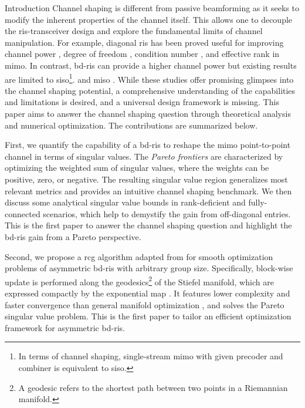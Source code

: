 \documentclass[journal]{IEEEtran}
\begin{document}
\begin{section}{Introduction}
	Channel shaping is different from passive beamforming as it seeks to modify the inherent properties of the channel itself.
	This allows one to decouple the \gls{ris}-transceiver design and explore the fundamental limits of channel manipulation.
	For example, diagonal \gls{ris} has been proved useful for improving channel power \cite{Ning2020}, degree of freedom \cite{Ozdogan2020,Li2023h}, condition number \cite{Zheng2022,Huang2023}, and effective rank \cite{ElMossallamy2021,Meng2023} in \gls{mimo}.
	In contrast, \gls{bd}-\gls{ris} can provide a higher channel power but existing results are limited to \gls{siso}\footnote{In terms of channel shaping, single-stream \gls{mimo} with given precoder and combiner \cite{Nerini2023} is equivalent to \gls{siso}.}. \cite{Nerini2023} and \gls{miso} \cite{Santamaria2023}.
	While these studies offer promising glimpses into the channel shaping potential, a comprehensive understanding of the capabilities and limitations is desired, and a universal design framework is missing.
	This paper aims to answer the channel shaping question through theoretical analysis and numerical optimization.
	The contributions are summarized below.

	First, we quantify the capability of a \gls{bd}-\gls{ris} to reshape the \gls{mimo} point-to-point channel in terms of singular values.
	The \emph{Pareto frontiers} are characterized by optimizing the {weighted sum of singular values}, where the weights can be positive, zero, or negative.
	The resulting singular value region generalizes most relevant metrics and provides an intuitive channel shaping benchmark.
	We then discuss some analytical singular value bounds in rank-deficient and fully-connected scenarios, which help to demystify the gain from off-diagonal entries.
	This is the first paper to answer the channel shaping question and highlight the \gls{bd}-\gls{ris} gain from a Pareto perspective.

	Second, we propose a \gls{rcg} algorithm adapted from \cite{Abrudan2008,Abrudan2009} for smooth optimization problems of asymmetric \gls{bd}-\gls{ris} with arbitrary group size.
	Specifically, block-wise update is performed along the geodesics\footnote{A geodesic refers to the shortest path between two points in a Riemannian manifold.} of the Stiefel manifold, which are expressed compactly by the exponential map \cite{Edelman1998}.
	It features lower complexity and faster convergence than general manifold optimization \cite{Absil2009,Pan2022d}, and solves the Pareto singular value problem.
	This is the first paper to tailor an efficient optimization framework for asymmetric \gls{bd}-\gls{ris}.


\end{section}
\end{document}
